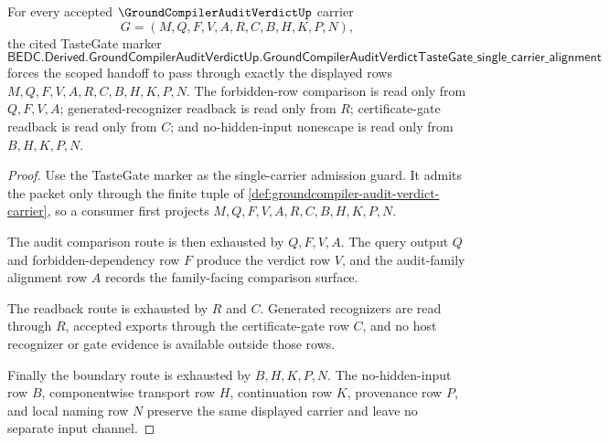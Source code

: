 \begin{theorem}
\label{thm:ground-compiler-audit-verdict-scoped-handoff}
For every accepted $\GroundCompilerAuditVerdictUp$ carrier
$$
G=(M,Q,F,V,A,R,C,B,H,K,P,N),
$$
the cited TasteGate marker
$$
\mathsf{BEDC.Derived.GroundCompilerAuditVerdictUp.GroundCompilerAuditVerdictTasteGate\_single\_carrier\_alignment}
$$
forces the scoped handoff to pass through exactly the displayed rows $M,Q,F,V,A,R,C,B,H,K,P,N$. The forbidden-row comparison is read only from $Q,F,V,A$; generated-recognizer readback is read only from $R$; certificate-gate readback is read only from $C$; and no-hidden-input nonescape is read only from $B,H,K,P,N$.
\end{theorem}
\begin{proof}
Use the TasteGate marker as the single-carrier admission guard. It admits the packet only through the finite tuple of \autoref{def:groundcompiler-audit-verdict-carrier}, so a consumer first projects $M,Q,F,V,A,R,C,B,H,K,P,N$.

The audit comparison route is then exhausted by $Q,F,V,A$. The query output $Q$ and forbidden-dependency row $F$ produce the verdict row $V$, and the audit-family alignment row $A$ records the family-facing comparison surface.

The readback route is exhausted by $R$ and $C$. Generated recognizers are read through $R$, accepted exports through the certificate-gate row $C$, and no host recognizer or gate evidence is available outside those rows.

Finally the boundary route is exhausted by $B,H,K,P,N$. The no-hidden-input row $B$, componentwise transport row $H$, continuation row $K$, provenance row $P$, and local naming row $N$ preserve the same displayed carrier and leave no separate input channel.
\end{proof}

